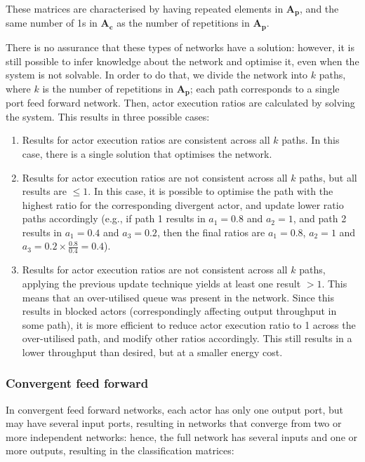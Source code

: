 These matrices are characterised by having repeated elements in $\textbf{A}_{\textbf{p}}$, and the same number of 1s in $\textbf{A}_{\textbf{c}}$ as the number of repetitions in $\textbf{A}_{\textbf{p}}$.
\par There is no assurance that these types of networks have a solution: however, it is still possible to infer knowledge about the network and optimise it, even when the system is not solvable. In order to do that, we divide the network into $k$ paths, where $k$ is the number of repetitions in $\textbf{A}_{\textbf{p}}$; each path corresponds to a single port feed forward network. Then, actor execution ratios are calculated by solving the system. This results in three possible cases:

\begin{enumerate}
\item Results for actor execution ratios are consistent across all $k$ paths. In this case, there is a single solution that optimises the network.
\item Results for actor execution ratios are not consistent across all $k$ paths, but all results are $\leq1$. In this case, it is possible to optimise the path with the highest ratio for the corresponding divergent actor, and update lower ratio paths accordingly (e.g., if path 1 results in $a_1=0.8$ and $a_2=1$, and path 2 results in $a_1=0.4$ and $a_3=0.2$, then the final ratios are $a_1=0.8$, $a_2=1$ and $a_3=0.2 \times \frac{0.8}{0.4} = 0.4$).
\item Results for actor execution ratios are not consistent across all $k$ paths, applying the previous update technique yields at least one result $>1$. This means that an over-utilised queue was present in the network. Since this results in blocked actors (correspondingly affecting output throughput in some path), it is more efficient to reduce actor execution ratio to 1 across the over-utilised path, and modify other ratios accordingly. This still results in a lower throughput than desired, but at a smaller energy cost. 
\end{enumerate}





\subsubsection{Convergent feed forward}

In convergent feed forward networks, each actor has only one output port, but may have several input ports, resulting in networks that converge from two or more independent networks: hence, the full network has several inputs and one or more outputs, resulting in the classification matrices:

